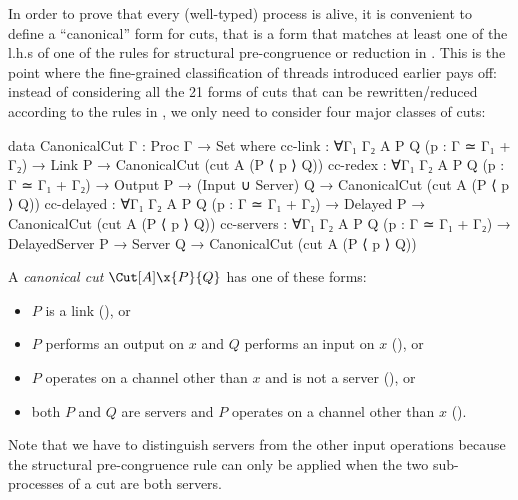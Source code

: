 In order to prove that every (well-typed) process is alive, it is convenient to
define a ``canonical'' form for cuts, that is a form that matches at least one
of the l.h.s of one of the rules for structural pre-congruence or reduction in
. This is the point where the fine-grained classification of
threads introduced earlier pays off: instead of considering all the 21 forms of
cuts that can be rewritten/reduced according to the rules in
, we only need to consider four major classes of cuts:

\begin{code}
data CanonicalCut {Γ} : Proc Γ → Set where
  cc-link     : ∀{Γ₁ Γ₂ A P Q} (p : Γ ≃ Γ₁ + Γ₂) →
                Link P → CanonicalCut (cut {A} (P ⟨ p ⟩ Q))
  cc-redex    : ∀{Γ₁ Γ₂ A P Q} (p : Γ ≃ Γ₁ + Γ₂) →
                Output P → (Input ∪ Server) Q →
                CanonicalCut (cut {A} (P ⟨ p ⟩ Q))
  cc-delayed  : ∀{Γ₁ Γ₂ A P Q} (p : Γ ≃ Γ₁ + Γ₂) →
                Delayed P → CanonicalCut (cut {A} (P ⟨ p ⟩ Q))
  cc-servers  : ∀{Γ₁ Γ₂ A P Q} (p : Γ ≃ Γ₁ + Γ₂) →
                DelayedServer P → Server Q →
                CanonicalCut (cut {A} (P ⟨ p ⟩ Q))
\end{code}

A \emph{canonical cut} $\Cut[A]\x{P}{Q}$ has one of these forms:
\begin{itemize}
\item $P$ is a link (), or
\item $P$ performs an output on $x$ and $Q$ performs an input on $x$
  (), or
\item $P$ operates on a channel other than $x$ and is not a server
(), or
\item both $P$ and $Q$ are servers and $P$ operates on a channel other than $x$
().
\end{itemize}

Note that we have to distinguish servers from the other input operations because
the structural pre-congruence rule \SServer can only be applied when the two
sub-processes of a cut are both servers.

